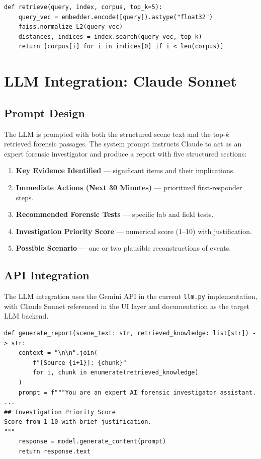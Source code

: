 \documentclass[12pt,a4paper]{article}
\begin{document}
\begin{lstlisting}[style=pythonstyle, caption={FAISS Retrieval (rag.py)}]
def retrieve(query, index, corpus, top_k=5):
    query_vec = embedder.encode([query]).astype("float32")
    faiss.normalize_L2(query_vec)
    distances, indices = index.search(query_vec, top_k)
    return [corpus[i] for i in indices[0] if i < len(corpus)]
\end{lstlisting}

\section{LLM Integration: Claude Sonnet}

\subsection{Prompt Design}

The LLM is prompted with both the structured scene text and the top-$k$ retrieved
forensic passages. The system prompt instructs Claude to act as an expert forensic
investigator and produce a report with five structured sections:

\begin{enumerate}
  \item \textbf{Key Evidence Identified} — significant items and their implications.
  \item \textbf{Immediate Actions (Next 30 Minutes)} — prioritized first-responder steps.
  \item \textbf{Recommended Forensic Tests} — specific lab and field tests.
  \item \textbf{Investigation Priority Score} — numerical score (1--10) with justification.
  \item \textbf{Possible Scenario} — one or two plausible reconstructions of events.
\end{enumerate}

\subsection{API Integration}

The LLM integration uses the Gemini API in the current \texttt{llm.py}
implementation, with Claude Sonnet referenced in the UI layer and documentation
as the target LLM backend.

\begin{lstlisting}[style=pythonstyle, caption={Report Generation (llm.py)}]
def generate_report(scene_text: str, retrieved_knowledge: list[str]) -> str:
    context = "\n\n".join(
        f"[Source {i+1}]: {chunk}"
        for i, chunk in enumerate(retrieved_knowledge)
    )
    prompt = f"""You are an expert AI forensic investigator assistant.
...
## Investigation Priority Score
Score from 1-10 with brief justification.
"""
    response = model.generate_content(prompt)
    return response.text
\end{lstlisting}
\end{document}

